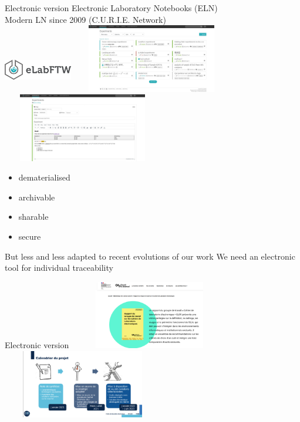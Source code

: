 \begin{frame}{Electronic version}
Electronic Laboratory Notebooks (ELN) \\
Modern LN since 2009 (C.U.R.I.E. Network) \\
\includegraphics[width=3cm,height=2cm]{images/elabftw-logo.png}
\includegraphics[width=7cm,height=3cm]{images/elabftw1.jpg}
\includegraphics[width=7cm,height=3cm]{images/elabftw2.jpg}
 \begin{itemize}
 	\item dematerialised
 	\item archivable
 	\item sharable
 	\item secure
 \end{itemize}

\centering But less and less adapted to recent evolutions of our work
\centering We need an electronic tool for individual traceability
\end{frame}

\begin{frame}{Electronic version}
\includegraphics[width=7cm,height=3cm]{images/gt_eln.png}
\includegraphics[width=7cm,height=3cm]{images/gt_eln_temp.png}
\end{frame}

